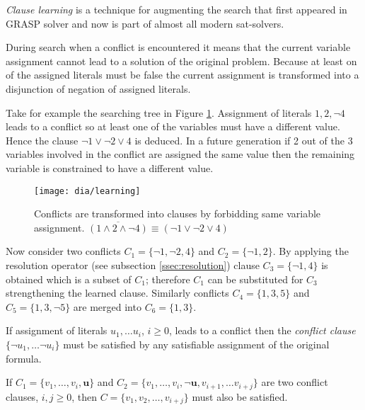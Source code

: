 \emph{Clause learning} is a technique for augmenting the search
that first appeared in GRASP solver \cite{Marques-silva99grasp:a}
and now is part of almost all modern sat-solvers.

During search when a conflict is encountered it means that the
current variable assignment cannot lead to a solution of the original
problem. Because at least on of the assigned literals must be false
the current assignment is transformed into a disjunction of negation
of assigned literals.

Take for example the searching tree in Figure \ref{fig:learning}.
Assignment of literals $1, 2, \neg 4$ leads to a conflict so at
least one of the variables must have a different value. Hence
the clause $\neg 1 \lor \neg 2 \lor 4$ is deduced. In a future
generation if 2 out of the 3 variables involved in the conflict are
assigned the same value then the remaining variable is constrained
to have a different value.

\begin{figure}
  \centering
  \texttt{[image: dia/learning]}
  \caption{Conflicts are transformed into clauses by forbidding
  same variable assignment.
  $\overline{(1 \land 2 \land \neg 4)} \equiv (\neg 1 \lor \neg 2 \lor 4)$}
  \label{fig:learning}
\end{figure}

Now consider two conflicts $C_1 = \{ \neg 1, \neg 2, 4 \}$ and
$C_2 = \{ \neg 1, 2 \}$.  By applying the resolution operator
(see subsection \ref{ssec:resolution}) clause $C_3 = \{ \neg 1,
4 \}$ is obtained which is a subset of $C_1$; therefore $C_1$ can
be substituted for $C_3$ strengthening the learned clause. Similarly
conflicts $C_4 = \{ 1, 3, 5 \}$ and $C_5 = \{1, 3, \neg 5\}$ are
merged into $C_6 = \{ 1, 3 \}$.

\begin{myprop}
  If assignment of literals $u_1, \ldots u_i$, $i \ge 0$, leads to
  a conflict then the \emph{conflict clause} $\{ \neg u_1, \ldots
  \neg u_i \}$ must be satisfied by any satisfiable assignment of
  the original formula.
\end{myprop}

\begin{myprop}
  If $C_1 = \{ v_1, \ldots, v_i, \mathbf{u} \}$ and $C_2 = \{
  v_1, \ldots, v_i, \mathbf{\neg u}, v_{i+1}, \ldots v_{i+j} \}$
  are two conflict clauses, $i, j \ge 0$, then $C = \{ v_1, v_2,
  \ldots, v_{i+j} \}$ must also be satisfied.
\end{myprop}

